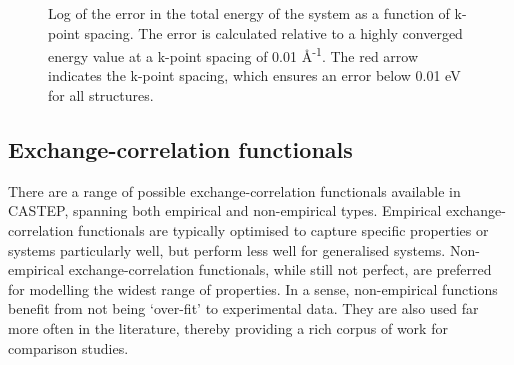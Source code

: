 \begin{figure}[ht]
\begin{center}
		\caption{Log of the error in the total energy of the system as a function of k-point spacing. The error is calculated relative to a highly converged energy value at a k-point spacing of 0.01 \r{A}\textsuperscript{-1}. The red arrow indicates the k-point spacing, which ensures an error below 0.01 eV for all structures.}
		\label{Figure:kpoint_convergence}
	\end{center}
\end{figure}

\subsection{Exchange-correlation functionals}

There are a range of possible exchange-correlation functionals available in CASTEP, spanning both empirical and non-empirical types. Empirical exchange-correlation functionals are typically optimised to capture specific properties or systems particularly well, but perform less well for generalised systems. Non-empirical exchange-correlation functionals, while still not perfect, are preferred for modelling the widest range of properties. In a sense, non-empirical functions benefit from not being `over-fit' to experimental data. They are also used far more often in the literature, thereby providing a rich corpus of work for comparison studies.

